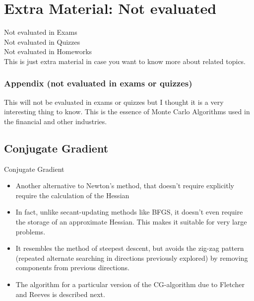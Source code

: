 \documentclass[xcolor=dvipsnames,11pt]{beamer}
\newcommand{\highlight}[1]{\textcolor{BrickRed}{#1}}
\begin{document}
\section{Extra Material: Not evaluated}

\begin{frame}{\secname}
\Large 
\highlight{Not evaluated in Exams}\\
\highlight{Not evaluated in Quizzes}\\
\highlight{Not evaluated in Homeworks}\\[11pt]
This is just extra material in case you want to know more about related topics. 


\end{frame}

\begin{frame}
\frametitle{Appendix (not evaluated in exams or quizzes)}

\vspace{-7pt}


\vspace{-7pt}
\begin{exampleblock}{}
	This will not be evaluated in exams or quizzes but I thought it is a very interesting thing to know. This is the essence of Monte Carlo Algorithms used in the financial and other industries.  
\end{exampleblock}
\end{frame}		



\subsection{Conjugate Gradient}

\begin{frame}{Conjugate Gradient}
\begin{itemize}
	\item Another alternative to Newton's method, that doesn't require explicitly require the calculation of the Hessian
	\item In fact, unlike secant-updating methods like BFGS, it doesn't even require the storage of an approximate Hessian. This makes it suitable for very large problems.
	\item  It resembles the method of steepest descent, but avoids the zig-zag pattern (repeated alternate searching in directions previously explored) by removing components from previous directions.
	\item The algorithm for a particular version of the CG-algorithm due to Fletcher and Reeves is described next.
\end{itemize}
\end{frame}
\end{document}
